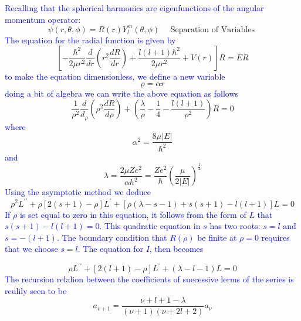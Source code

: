 \documentclass{article}
\begin{document}
\textcolor{blue}{Recalling that the spherical
harmonics are eigenfunctions of the angular momentum operator:}
\begin{equation}
    \psi(r, \theta, \phi)=R(r) Y_{l}^{m}(\theta, \phi) \quad \text { Separation of Variables }
\end{equation}
 \textcolor{blue}{The equation for the radial function is given by}
 \begin{equation}
    \left[-\frac{\hbar^{2}}{2 \mu r^{2}} \frac{d}{d r}\left(r^{2} \frac{d R}{d r}\right)+\frac{l(l+1) \hbar^{2}}{2 \mu r^{2}}+V(r)\right] R=E R
\end{equation}
\textcolor{blue}{to make the equation dimensionless, we define a new variable}
\begin{equation}
    \rho=\alpha r
\end{equation}
\textcolor{blue}{doing a bit of algebra we can write the above equation as follows}
\begin{equation}
    \frac{1}{\rho^{2}} \frac{d}{d_{\rho}}\left(\rho^{2} \frac{d R}{d \rho}\right)+\left(\frac{\lambda}{\rho}-\frac{1}{4}-\frac{l(l+1)}{\rho^{2}}\right) R=0
\end{equation}
\textcolor{blue}{where}
\begin{equation}
    \alpha^{2}=\frac{8 \mu|E|}{\hbar^{2}} 
\end{equation}
\textcolor{blue}{and}
\begin{equation}
     \lambda=\frac{2 \mu Z e^{2}}{\alpha h^{2}}=\frac{Z e^{2}}{\hbar}\left(\frac{\mu}{2|E|}\right)^{\frac{1}{2}}
\end{equation}
\textcolor{blue}{Using the asymptotic method we deduce}
\begin{equation}
    \rho^{2} L^{\prime \prime}+\rho[2(s+1)-\rho] L^{\prime}+[\rho(\lambda-s-1)+s(s+1)-l(l+1)] L=0
\end{equation}
\textcolor{blue}{If $\rho$ is set equal to zero in this equation, it follows from the form of $L$ that $s(s+1)-l(l+1)=0 .$ This quadratic equation in $s$ has two roots: $s=l$ and $s=-(l+1)$. The boundary condition that $R(\rho)$ be finite at $\rho=0$ requires that we choose $s=l$. The equation for $I$, then becomes}

\begin{equation}
    \rho L^{\prime \prime}+[2(l+1)-\rho] L^{\prime}+(\lambda-l-1) L=0
\end{equation}
\textcolor{blue}{The recursion relalion between the coefficients of suecessive lerms of the series is reulily seen to be}
\begin{equation}
    a_{v+1}=\frac{\nu+l+1-\lambda}{(\nu+1)(\nu+2 l+2)} a_{\nu}
\end{equation}
\end{document}
